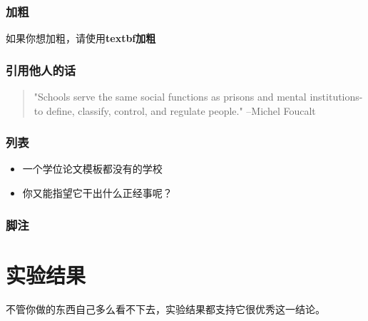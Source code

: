 \documentclass[a4paper,AutoFakeBold,oneside,12pt]{book}
\begin{document}
\subsection{加粗}
如果你想加粗，请使用\textbf{textbf加粗}

\subsection{引用他人的话}

\begin{quotation}
    "Schools serve the same social functions as prisons and mental institutions- to define, classify, control, and regulate people."
        --Michel Foucalt
\end{quotation}


\subsection{列表}
\begin{itemize}
    \item 一个学位论文模板都没有的学校
    \item 你又能指望它干出什么正经事呢？
\end{itemize}
\subsection{脚注}

\chapter{实验结果}
不管你做的东西自己多么看不下去，实验结果都支持它很优秀这一结论。



\end{document}
